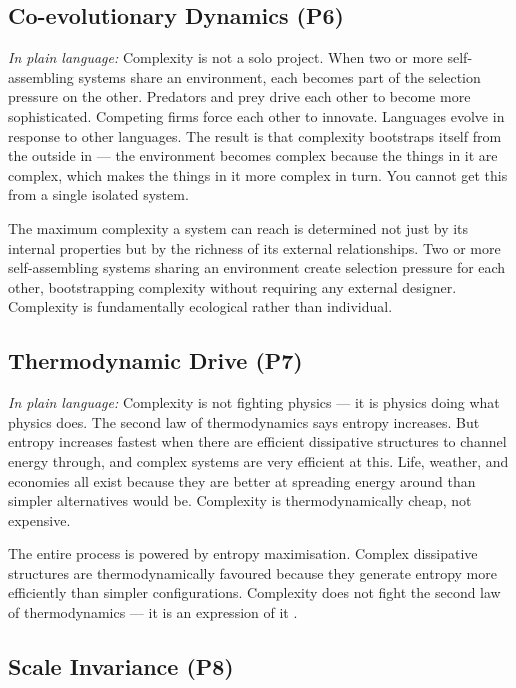 \documentclass[12pt,a4paper]{article}
\begin{document}
\subsection{Co-evolutionary Dynamics (P6)}

\textit{In plain language:} Complexity is not a solo project.
When two or more self-assembling systems share an environment, each
becomes part of the selection pressure on the other.
Predators and prey drive each other to become more sophisticated.
Competing firms force each other to innovate.
Languages evolve in response to other languages.
The result is that complexity bootstraps itself from the outside in —
the environment becomes complex because the things in it are complex,
which makes the things in it more complex in turn.
You cannot get this from a single isolated system.

The maximum complexity a system can reach is determined not just by its
internal properties but by the richness of its external relationships.
Two or more self-assembling systems sharing an environment create
selection pressure for each other, bootstrapping complexity without
requiring any external designer.
Complexity is fundamentally ecological rather than individual.

\subsection{Thermodynamic Drive (P7)}

\textit{In plain language:} Complexity is not fighting physics — it is
physics doing what physics does.
The second law of thermodynamics says entropy increases.
But entropy increases fastest when there are efficient dissipative
structures to channel energy through, and complex systems are very
efficient at this.
Life, weather, and economies all exist because they are better at
spreading energy around than simpler alternatives would be.
Complexity is thermodynamically cheap, not expensive.

The entire process is powered by entropy maximisation.
Complex dissipative structures \citep{prigogine1977} are
thermodynamically favoured because they generate entropy more efficiently
than simpler configurations.
Complexity does not fight the second law of thermodynamics — it is an
expression of it \citep{england2013}.

\subsection{Scale Invariance (P8)}
\end{document}
